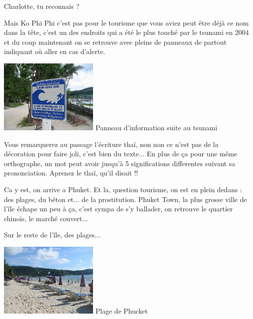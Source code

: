 \begin{multicols}{2}
Charlotte, tu reconnais ?

Mais Ko Phi Phi c'est pas pour le tourisme que vous aviez peut être déjà ce nom dans la tête, c'est un des endroits qui a été le plus touché par le tsunami en 2004 et du coup maintenant on se retrouve avec pleins de panneaux de partout indiquant où aller en cas d'alerte.

\hspace*{-0.65cm}
\includegraphics[width=4.8cm]{articles/Phucket/12121623755piH.jpg}
Panneau d'information suite au tsunami

Vous remarquerez au passage l'écriture thaï, non non ce n'est pas de la décoration pour faire joli, c'est bien du texte... En plus de ça pour une même orthographe, un mot peut avoir jusqu'à 5 significations differentes suivant sa prononciation. Aprenez le thaï, qu'il disait !!

Ca y est, on arrive a Phuket. Et la, question tourisme, on est en plein dedans : des plages, du béton et... de la prostitution. Phuket Town, la plus grosse ville de l'île échape un peu à ça, c'est sympa de s'y ballader, on retrouve le quartier chinois, le marché couvert...


Sur le reste de l'île, des plages...

\hspace*{-0.65cm}
\includegraphics[width=4.8cm]{articles/Phucket/1212162370ANUw.jpg}
Plage de Phucket


\end{multicols}
